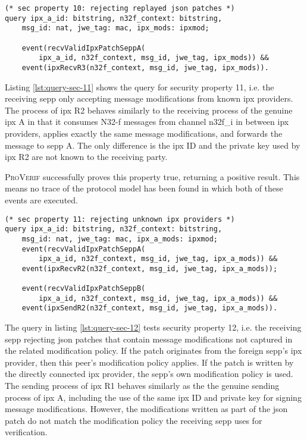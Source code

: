 \begin{lstlisting}[caption={Query for security property 10},label={lst:query-sec-10},firstnumber=356]
(* sec property 10: rejecting replayed json patches *)
query ipx_a_id: bitstring, n32f_context: bitstring,
    msg_id: nat, jwe_tag: mac, ipx_mods: ipxmod;

    event(recvValidIpxPatchSeppA(
        ipx_a_id, n32f_context, msg_id, jwe_tag, ipx_mods)) &&
    event(ipxRecvR3(n32f_context, msg_id, jwe_tag, ipx_mods)).
\end{lstlisting}

Listing \ref{lst:query-sec-11} shows the query for security property 11, i.e. the receiving \gls{sepp} only accepting message modifications from known \gls{ipx} providers.
The process of \gls{ipx} R2 behaves similarly to the receiving process of the genuine \gls{ipx} A in that it consumes N32-f messages from channel {\sffamily n32f\_i} in between \gls{ipx} providers, applies exactly the same message modifications, and forwards the message to \gls{sepp} A.
The only difference is the \gls{ipx} ID and the private key used by \gls{ipx} R2 are not known to the receiving party.

\textsc{ProVerif} successfully proves this property true, returning a positive result.
This means no trace of the protocol model has been found in which both of these events are executed.

\begin{lstlisting}[caption={Query for security property 11},label={lst:query-sec-11},firstnumber=364]
(* sec property 11: rejecting unknown ipx providers *)
query ipx_a_id: bitstring, n32f_context: bitstring,
    msg_id: nat, jwe_tag: mac, ipx_a_mods: ipxmod;
    event(recvValidIpxPatchSeppA(
        ipx_a_id, n32f_context, msg_id, jwe_tag, ipx_a_mods)) &&
    event(ipxRecvR2(n32f_context, msg_id, jwe_tag, ipx_a_mods));

    event(recvValidIpxPatchSeppB(
        ipx_a_id, n32f_context, msg_id, jwe_tag, ipx_a_mods)) &&
    event(ipxSendR2(n32f_context, msg_id, jwe_tag, ipx_a_mods)).
\end{lstlisting}

The query in listing \ref{lst:query-sec-12} tests security property 12, i.e. the receiving \gls{sepp} rejecting \gls{json} patches that contain message modifications not captured in the related modification policy.
If the patch originates from the foreign \gls{sepp}'s \gls{ipx} provider, then this peer's modification policy applies.
If the patch is written by the directly connected \gls{ipx} provider, the \gls{sepp}'s own modification policy is used.
The sending process of \gls{ipx} R1 behaves similarly as the the genuine sending process of \gls{ipx} A, including the use of the same \gls{ipx} ID and private key for signing message modifications.
However, the modifications written as part of the \gls{json} patch do not match the modification policy the receiving \gls{sepp} uses for verification.

